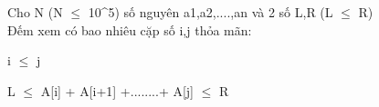 Cho N (N $\le$ 10^5) số nguyên a1,a2,....,an và 2 số L,R (L $\le$ R)    
\\



    Đếm xem có bao nhiêu cặp số i,j thỏa mãn:   



    i  $\le$  j   



    L $\le$  A[i] + A[i+1] +........+ A[j]  $\le$ R